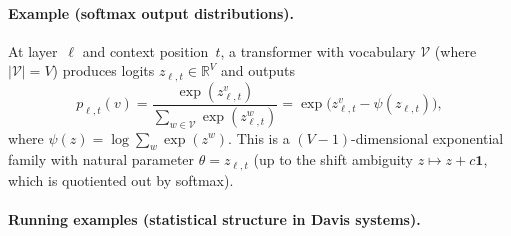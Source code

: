 \documentclass[11pt]{article}
\newcommand{\RR}{\mathbb{R}}
\theoremstyle{remark}
\begin{document}
\paragraph{Example (softmax output distributions).}
At layer~$\ell$ and context position~$t$, a transformer with vocabulary
$\mathcal{V}$ (where $|\mathcal{V}| = V$) produces logits
$z_{\ell,t} \in \RR^V$ and outputs
\[
p_{\ell,t}(v) = \frac{\exp(z_{\ell,t}^v)}{\sum_{w \in \mathcal{V}}
\exp(z_{\ell,t}^w)}
= \exp\!\bigl(z_{\ell,t}^v - \psi(z_{\ell,t})\bigr),
\]
where $\psi(z) = \log \sum_w \exp(z^w)$.  This is a $(V{-}1)$-dimensional
exponential family with natural parameter
$\theta = z_{\ell,t}$ (up to the shift ambiguity $z \mapsto z + c\mathbf{1}$,
which is quotiented out by softmax).

\paragraph{Running examples (statistical structure in Davis systems).}
\end{document}
